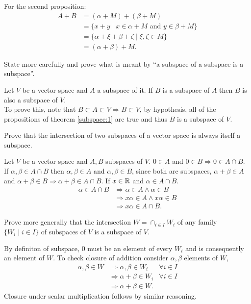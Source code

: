 \documentclass[../../main.tex]{subfiles}
\begin{document}
\begin{solution}
	
	For the second proposition:
	\begin{align*}
		A + B &= (\alpha + M) + (\beta + M) \\
			  &= \{x + y \mid x \in \alpha + M \text{ and } y \in \beta + M \} \\
			  &= \{\alpha + \xi + \beta + \zeta \mid \xi, \zeta \in M\} \\
			  &= (\alpha + \beta) + M.
	\end{align*}
\end{solution}
\begin{problem}
State more carefully and prove what is meant by ``a subspace of a subspace is a subspace''.	
\end{problem}
\begin{solution}
	Let $V$ be a vector space and $A$ a subspace of it. If $B$ is a subspace of $A$ then $B$ is also a subspace of $V$.
	\\
	To prove this, note that $B \subset A \subset V \Rightarrow B \subset V$, by hypothesis, all of the propositions of theorem \ref{subspace:1} are true and thus $B$ is a subspace of $V$.
\end{solution}
\begin{problem}
Prove that the intersection of two subspaces of a vector space is always itself a subspace.	
\end{problem}
\begin{solution}
Let $V$ be a vector space and $A,B$ subspaces of $V$. $0 \in A$ and $0 \in B \Rightarrow 0 \in A \cap B$. If $\alpha,\beta \in A \cap B$ then $\alpha,\beta \in A$ and $\alpha, \beta \in B$, since both are subspaces, $\alpha+\beta \in A$ and $\alpha + \beta \in B \Rightarrow \alpha+\beta \in A \cap B$. If $x \in \mathbb{R}$ and $\alpha \in A \cap B$.
\begin{align*}
\alpha \in A \cap B & \Rightarrow \alpha \in A \wedge \alpha \in B \\
& \Rightarrow x\alpha \in A \wedge x\alpha \in B \\
& \Rightarrow x\alpha \in A \cap B.
\end{align*} 
\end{solution}
\begin{problem}
Prove more generally that the intersection $W = \cap_{i\in I} W_i$ of any family $\{W_i \mid i \in I \}$ of subspaces of $V$ is a subspace of $V$.
\end{problem}
\begin{solution}
	By definiton of subspace, $0$ must be an element of every $W_i$ and is consequently an element of $W$. To check closure of addition consider $\alpha, \beta$ elements of $W$,
	\begin{align*}
	\alpha, \beta \in W & \Rightarrow \alpha, \beta \in W_i & \forall i \in I \\
	& \Rightarrow \alpha + \beta \in W_i & \forall i \in I \\
	& \Rightarrow \alpha + \beta \in W.
	\end{align*}
	Closure under scalar multiplication follows by similar reasoning. 
\end{solution}
\end{document}
